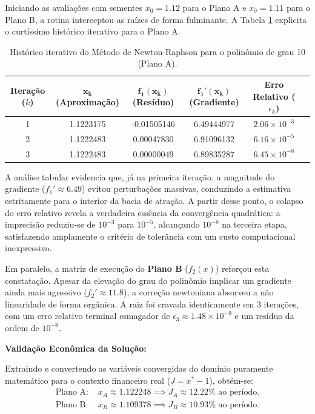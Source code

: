 Iniciando as avaliações com sementes $x_0 = 1.12$ para o Plano A e $x_0 = 1.11$ para o Plano B, a rotina interceptou as raízes de forma fulminante. A Tabela \ref{tab:newton_raphson_juros_f1} explicita o curtíssimo histórico iterativo para o Plano A.

\begin{table}[htpb]
\centering
\caption{Histórico iterativo do Método de Newton-Raphson para o polinômio de grau 10 (Plano A).}
\label{tab:newton_raphson_juros_f1}
\small
\begin{tabular}{@{}cccccc@{}}
\toprule
\textbf{Iteração ($k$)} & $\mathbf{x_k}$ (Aproximação) & $\mathbf{f_1(x_k)}$ (Resíduo) & $\mathbf{f_1'(x_k)}$ (Gradiente) & \textbf{Erro Relativo} ($\epsilon_k$) \\ \midrule
1 & 1.1223175 & -0.01505146 & 6.49444977 & $2.06 \times 10^{-3}$ \\
2 & 1.1222483 & \phantom{-}0.00047830 & 6.91096132 & $6.16 \times 10^{-5}$ \\
3 & 1.1222483 & \phantom{-}0.00000049 & 6.89835287 & $6.45 \times 10^{-8}$ \\ \bottomrule
\end{tabular}
\end{table}

A análise tabular evidencia que, já na primeira iteração, a magnitude do gradiente ($f_1' \approx 6.49$) evitou perturbações massivas, conduzindo a estimativa estritamente para o interior da bacia de atração. A partir desse ponto, o colapso do erro relativo revela a verdadeira essência da convergência quadrática: a imprecisão reduziu-se de $10^{-3}$ para $10^{-5}$, alcançando $10^{-8}$ na terceira etapa, satisfazendo amplamente o critério de tolerância com um custo computacional inexpressivo.

Em paralelo, a matriz de execução do \textbf{Plano B} ($f_2(x)$) reforçou esta constatação. Apesar da elevação do grau do polinômio implicar um gradiente ainda mais agressivo ($f_2' \approx 11.8$), a correção newtoniana absorveu a não linearidade de forma orgânica. A raiz foi cravada identicamente em 3 iterações, com um erro relativo terminal esmagador de $\epsilon_3 \approx 1.48 \times 10^{-9}$ e um resíduo da ordem de $10^{-8}$.

\textbf{Validação Econômica da Solução:}

Extraindo e convertendo as variáveis convergidas do domínio puramente matemático para o contexto financeiro real ($J = x^* - 1$), obtém-se:
\begin{align}
    \text{Plano A: } & x_A \approx 1.122248 \implies J_A \approx 12.22\% \text{ ao período.} \\
    \text{Plano B: } & x_B \approx 1.109378 \implies J_B \approx 10.93\% \text{ ao período.}
\end{align}

